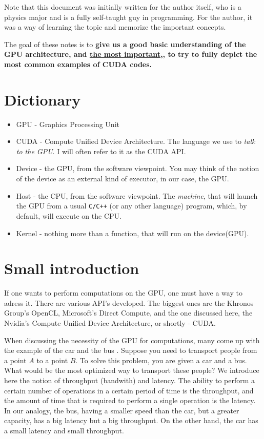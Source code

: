 \documentclass[12pt]{article}
\begin{document}
Note that this document was initially written for the author itself, who is a physics major 
and is a fully self-taught guy in programming. 
For the author, it was a way of learning the topic and memorize 
the important concepts. 

The goal of these notes is to \textbf{give us a good basic understanding of the 
GPU architecture, and \underline{the most important,}, to try to fully depict
the most common examples of CUDA codes.} 

\section*{Dictionary}
\label{section:dictionary}
\begin{itemize}
   \setlength\itemsep{-0.5em}
   \item GPU - Graphics Processing Unit
   \item CUDA - Compute Unified Device Architecture. The language we use to \textit{talk to the GPU}. I will often refer to it as the CUDA API. 
   \item Device - the GPU, from the software viewpoint. You may think of the notion of the 
   device as an external kind of executor, in our case, the GPU.
   \item Host - the CPU, from the software viewpoint. The \textit{machine}, that will launch the GPU from a
    usual \verb|C/C++| (or any other language) program, which, by default, will execute on the CPU.
   \item Kernel - nothing more than a function, that will run on the device(GPU).
\end{itemize}



\newpage

\section*{Small introduction}
If one wants to perform computations on the GPU, one must have a way to adress it. There are various
API's developed. The biggest ones are the Khronos Group's OpenCL, Microsoft's Direct Compute, and the one 
discussed here, the Nvidia's Compute Unified Device Architecture, or shortly - CUDA.


When discussing the necessity of the GPU for computations, many come up with the example of the car and the bus \cite{habr_car_vs_bus}. 
Suppose you need to transport people from a point $A$ to a point $B$. To solve this problem, you are 
given a car and a bus. What would be the most optimized way to transport these people? We introduce here
the notion of throughput (bandwith) and latency. The ability to perform a certain number of operations in a certain period of 
time is the throughput, and the amount of time that is required to perform a single operation is the latency.
In our analogy, the bus, having a smaller speed than the car, but a greater capacity, has a big latency but 
a big throughput. On the other hand, the car has a small latency and small throughput.
\end{document}
